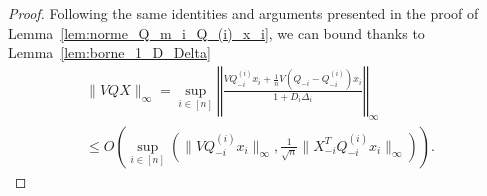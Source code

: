 \documentclass[a4papaer, titlepage]{book}
\begin{document}
 \begin{proof}
    Following the same identities and arguments presented in the proof of Lemma~\ref{lem:norme_Q_m_i_Q_(i)_x_i}, we can bound thanks to Lemma~\ref{lem:borne_1_D_Delta}
  \begin{align*}
    \| V Q  X\|_\infty
    = \sup_{i\in[n]} \left\Vert  \frac{VQ_{-i}^{(i)} x_i + \frac{1}{n}  V(Q_{-i} - Q_{-i}^{(i)}) x_i}{1+ D_i\Delta_i}\right\Vert_\infty\\
    \leq  O \left( \sup_{i\in[n]} \left(\|VQ_{-i}^{(i)} x_i\|_\infty, \frac{1}{\sqrt n} \|  X_{-i}^T Q_{-i}^{(i)} x_i \|_\infty\right) \right).
  \end{align*}

\end{proof}
\end{document}
